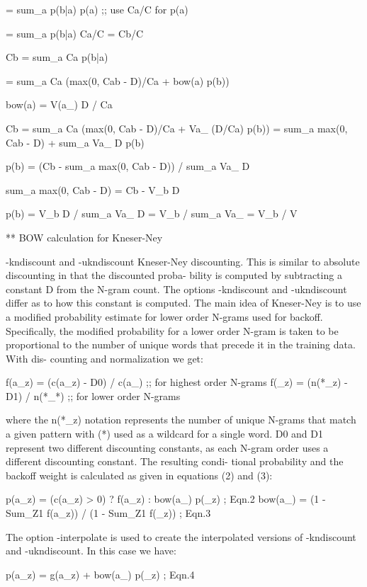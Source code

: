 = sum_a p(b|a) p(a)   ;; use Ca/C for p(a)

= sum_a p(b|a) Ca/C = Cb/C

Cb = sum_a Ca p(b|a) 

   = sum_a Ca (max(0, Cab - D)/Ca + bow(a) p(b))

bow(a) = V(a_) D / Ca

Cb = sum_a Ca (max(0, Cab - D)/Ca + Va_ (D/Ca) p(b))
   = sum_a max(0, Cab - D) + sum_a Va_ D p(b)

p(b) = (Cb - sum_a max(0, Cab - D)) / sum_a Va_ D

sum_a max(0, Cab - D) = Cb - V_b D

p(b) = V_b D / sum_a Va_ D = V_b / sum_a Va_ = V_b / V


** BOW calculation for Kneser-Ney

-kndiscount and -ukndiscount
       Kneser-Ney discounting.  This is similar to absolute discounting in that the discounted proba-
       bility is computed by subtracting a constant D from the N-gram count.  The options -kndiscount
       and -ukndiscount differ as to how this constant is computed.
       The  main idea of Kneser-Ney is to use a modified probability estimate for lower order N-grams
       used for backoff.  Specifically, the modified probability for a lower order N-gram is taken to
       be proportional to the number of unique words that precede it in the training data.  With dis-
       counting and normalization we get:

            f(a_z) = (c(a_z) - D0) / c(a_)     ;; for highest order N-grams
            f(_z)  = (n(*_z) - D1) / n(*_*)    ;; for lower order N-grams

       where the n(*_z) notation represents the number of unique N-grams that match a  given  pattern
       with  (*) used as a wildcard for a single word.  D0 and D1 represent two different discounting
       constants, as each N-gram order uses a different discounting constant.  The  resulting  condi-
       tional probability and the backoff weight is calculated as given in equations (2) and (3):

            p(a_z)  = (c(a_z) > 0) ? f(a_z) : bow(a_) p(_z)     ; Eqn.2
            bow(a_) = (1 - Sum_Z1 f(a_z)) / (1 - Sum_Z1 f(_z))  ; Eqn.3

       The  option  -interpolate  is  used  to  create  the  interpolated versions of -kndiscount and
       -ukndiscount.  In this case we have:

            p(a_z) = g(a_z) + bow(a_) p(_z)  ; Eqn.4

